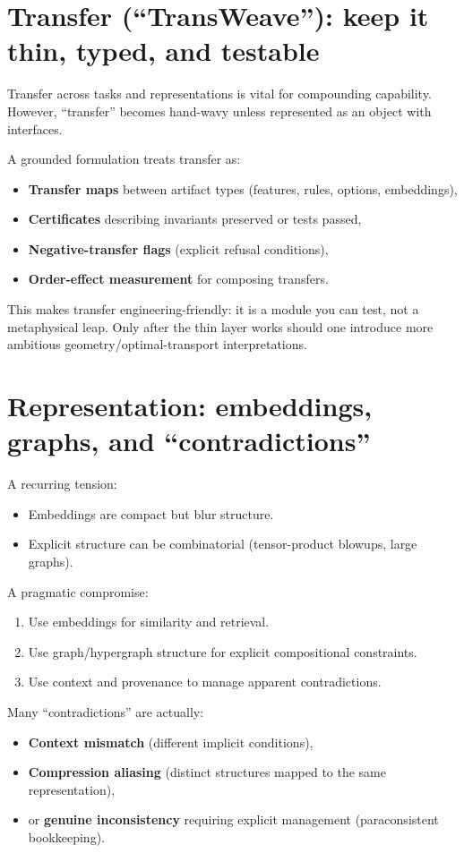 \documentclass[11pt]{article}
\begin{document}
\section{Transfer (``TransWeave''): keep it thin, typed, and testable}

Transfer across tasks and representations is vital for compounding capability.
However, ``transfer'' becomes hand-wavy unless represented as an object with interfaces.

A grounded formulation treats transfer as:
\begin{itemize}[leftmargin=2em]
\item \textbf{Transfer maps} between artifact types (features, rules, options, embeddings),
\item \textbf{Certificates} describing invariants preserved or tests passed,
\item \textbf{Negative-transfer flags} (explicit refusal conditions),
\item \textbf{Order-effect measurement} for composing transfers.
\end{itemize}

This makes transfer engineering-friendly: it is a module you can test, not a metaphysical leap.
Only after the thin layer works should one introduce more ambitious geometry/optimal-transport interpretations.

\section{Representation: embeddings, graphs, and ``contradictions''}

A recurring tension:
\begin{itemize}[leftmargin=2em]
\item Embeddings are compact but blur structure.
\item Explicit structure can be combinatorial (tensor-product blowups, large graphs).
\end{itemize}

A pragmatic compromise:
\begin{enumerate}[leftmargin=2em]
\item Use embeddings for similarity and retrieval.
\item Use graph/hypergraph structure for explicit compositional constraints.
\item Use context and provenance to manage apparent contradictions.
\end{enumerate}

Many ``contradictions'' are actually:
\begin{itemize}[leftmargin=2em]
\item \textbf{Context mismatch} (different implicit conditions),
\item \textbf{Compression aliasing} (distinct structures mapped to the same representation),
\item or \textbf{genuine inconsistency} requiring explicit management (paraconsistent bookkeeping).
\end{itemize}
\end{document}
